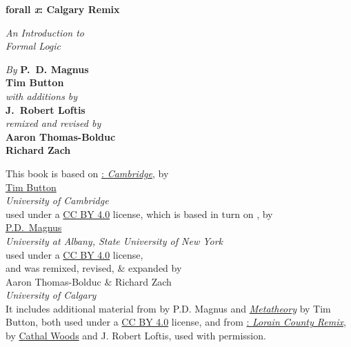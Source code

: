 

\pagestyle{empty}

\vspace*{80pt}

\begin{raggedleft}
\fontsize{24pt}{24pt}\selectfont
  \textbf{forall \textit{x}: Calgary Remix}

\medskip\fontsize{18pt}{20pt}\selectfont

\textit{An Introduction to\\ Formal Logic}

\vspace*{50pt}
\fontsize{16pt}{18pt}\selectfont \textit{By } \textbf{P.~D. Magnus}\\
\textbf{Tim Button}\\
\textit{with additions by}\\
\textbf{J.~Robert Loftis}\\
\textit{remixed and revised by}\\
\textbf{Aaron Thomas-Bolduc}\\ \textbf{Richard Zach}

\vfill
\forallxversion\par
\end{raggedleft}


\newpage


\noindent \small This book is based on \href{http://people.ds.cam.ac.uk/tecb2/forallx.shtml}{\forallx:\emph{ Cambridge}}, by\\[2ex]
\href{http://people.ds.cam.ac.uk/tecb2/index.shtml}{Tim Button}\\
\emph{University of Cambridge}\\[2ex]
used under a \href{https://creativecommons.org/licenses/by/4.0/}{CC BY 4.0} license, which is based in turn on \href{https://www.fecundity.com/logic/}{\forallx}, by\\[2ex]
\href{https://www.fecundity.com/job/}{P.D.\ Magnus}\\
\emph{University at Albany, State University of New York}\\[2ex]
used under a \href{https://creativecommons.org/licenses/by/4.0/}{CC BY 4.0} license,
\\
and was remixed, revised, \& expanded by\\[2ex] {Aaron Thomas-Bolduc \& Richard Zach}\\
\emph{University of Calgary}
\\[4ex]
It includes additional material from \forallx{} by P.D. Magnus
and \href{http://people.ds.cam.ac.uk/tecb2/metatheory.shtml}{\emph{Metatheory}} by Tim Button, both used under
a \href{https://creativecommons.org/licenses/by/4.0/}{CC BY 4.0}
license, and from \href{https://github.com/rob-helpy-chalk/openintroduction}{\forallx: \emph{Lorain County Remix}}, by \href{https://sites.google.com/site/cathalwoods/}{Cathal
Woods} and J. Robert Loftis, used with permission.

